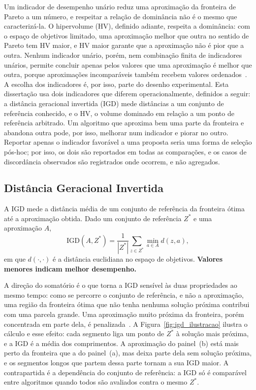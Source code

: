 Um indicador de desempenho unário reduz uma aproximação da fronteira de Pareto a um número, e respeitar a relação de dominância não é o mesmo que caracterizá-la. O hipervolume (HV), definido adiante, respeita a dominância: com o espaço de objetivos limitado, uma aproximação melhor que outra no sentido de Pareto tem HV maior, e HV maior garante que a aproximação não é pior que a outra. Nenhum indicador unário, porém, nem combinação finita de indicadores unários, permite concluir apenas pelos valores que uma aproximação é melhor que outra, porque aproximações incomparáveis também recebem valores ordenados~\cite{zitzler2004performance}. A escolha dos indicadores é, por isso, parte do desenho experimental. Esta dissertação usa dois indicadores que diferem operacionalmente, definidos a seguir: a distância geracional invertida (IGD) mede distâncias a um conjunto de referência conhecido, e o HV, o volume dominado em relação a um ponto de referência arbitrado. Um algoritmo que aproxima bem uma parte da fronteira e abandona outra pode, por isso, melhorar num indicador e piorar no outro. Reportar apenas o indicador favorável a uma proposta seria uma forma de seleção pós-hoc; por isso, os dois são reportados em todas as comparações, e os casos de discordância observados são registrados onde ocorrem, e não agregados.

\subsection{Distância Geracional Invertida}

A IGD mede a distância média de um conjunto de referência da fronteira ótima até a aproximação obtida. Dado um conjunto de referência $Z^{*}$ e uma aproximação $A$,
\begin{equation}
\mathrm{IGD}(A, Z^{*}) = \frac{1}{|Z^{*}|} \sum_{z \in Z^{*}} \min_{a \in A} d(z, a),
\label{eq:igd}
\end{equation}
em que $d(\cdot,\cdot)$ é a distância euclidiana no espaço de objetivos. \textbf{Valores menores indicam melhor desempenho.}

A direção do somatório é o que torna a IGD sensível às duas propriedades ao mesmo tempo: como se percorre o conjunto de referência, e não a aproximação, uma região da fronteira ótima que não tenha nenhuma solução próxima contribui com uma parcela grande. Uma aproximação muito próxima da fronteira, porém concentrada em parte dela, é penalizada~\cite{bosman2003balance}. A Figura~\ref{fig:igd_ilustracao} ilustra o cálculo e esse efeito: cada segmento liga um ponto de $Z^{*}$ à solução mais próxima, e a IGD é a média dos comprimentos. A aproximação do painel~(b) está mais perto da fronteira que a do painel~(a), mas deixa parte dela sem solução próxima, e os segmentos longos que partem dessa parte tornam a sua IGD maior. A contrapartida é a dependência do conjunto de referência: a IGD só é comparável entre algoritmos quando todos são avaliados contra o mesmo $Z^{*}$.

